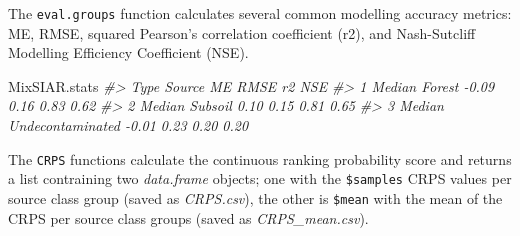 \documentclass[
]{article}
\newenvironment{Shaded}{\begin{snugshade}}{\end{snugshade}}
\newcommand{\AttributeTok}[1]{\textcolor[rgb]{0.13,0.29,0.53}{#1}}
\newcommand{\CommentTok}[1]{\textcolor[rgb]{0.56,0.35,0.01}{\textit{#1}}}
\newcommand{\FunctionTok}[1]{\textcolor[rgb]{0.13,0.29,0.53}{\textbf{#1}}}
\newcommand{\NormalTok}[1]{#1}
\newcommand{\OtherTok}[1]{\textcolor[rgb]{0.56,0.35,0.01}{#1}}
\newcommand{\SpecialCharTok}[1]{\textcolor[rgb]{0.81,0.36,0.00}{\textbf{#1}}}
\newcommand{\StringTok}[1]{\textcolor[rgb]{0.31,0.60,0.02}{#1}}
\begin{document}
The \texttt{eval.groups} function calculates several common modelling
accuracy metrics: ME, RMSE, squared Pearson's correlation coefficient
(r2), and Nash-Sutcliff Modelling Efficiency Coefficient (NSE).

\begin{Shaded}
\end{Shaded}

\begin{Shaded}
\begin{Highlighting}[]
\NormalTok{MixSIAR.stats}
\CommentTok{\#\textgreater{}     Type           Source    ME RMSE   r2  NSE}
\CommentTok{\#\textgreater{} 1 Median           Forest {-}0.09 0.16 0.83 0.62}
\CommentTok{\#\textgreater{} 2 Median          Subsoil  0.10 0.15 0.81 0.65}
\CommentTok{\#\textgreater{} 3 Median Undecontaminated {-}0.01 0.23 0.20 0.20}
\end{Highlighting}
\end{Shaded}

The \texttt{CRPS} functions calculate the continuous ranking probability
score and returns a list contraining two \emph{data.frame} objects; one
with the \texttt{\$samples} CRPS values per source class group (saved as
\emph{CRPS.csv}), the other is \texttt{\$mean} with the mean of the CRPS
per source class groups (saved as \emph{CRPS\_mean.csv}).
\end{document}
